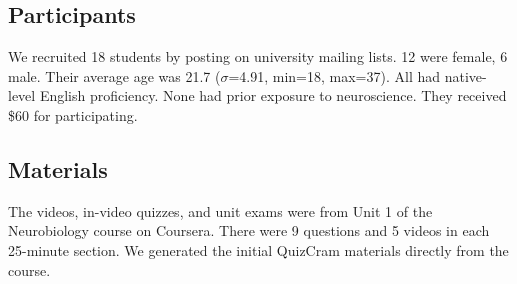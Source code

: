 \documentclass{sigchi}
\begin{document}


\subsection{Participants}

We recruited 18  students by posting on university mailing lists. 12 were female, 6 male. Their average age was 21.7 ($\sigma$=4.91, min=18, max=37). All had native-level English proficiency. None had prior exposure to neuroscience.  They received \$60 for participating. %

\subsection{Materials}



The videos, in-video quizzes, and unit exams were from Unit 1 of the Neurobiology course on Coursera. There were 9 questions and 5 videos in each 25-minute section. We generated the initial QuizCram materials directly from the course.
\end{document}
